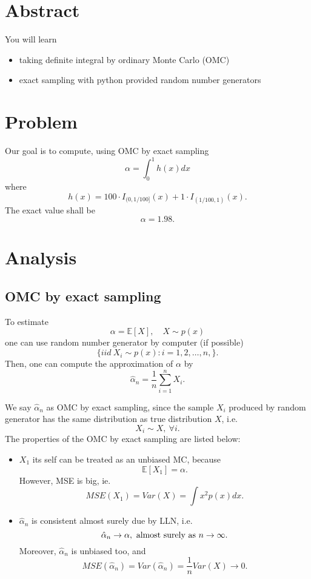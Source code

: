 \documentclass{article}
\begin{document}
\section{Abstract}
You will learn
\begin{itemize}
 \item taking definite integral by ordinary Monte Carlo (OMC)
 \item exact sampling with python provided random number generators
\end{itemize}

\section{Problem}
Our goal is to compute, using OMC by exact sampling
$$\alpha = \int_0^1 h(x) dx$$
where
$$h(x) = 100 \cdot I_{(0, 1/100]}(x) + 1\cdot I_{(1/100, 1)} (x).$$
The exact value shall be 
$$\alpha = 1.98.$$

\section{Analysis}

\subsection{OMC by exact sampling}
To estimate 
$$\alpha = \mathbb E[X], \quad X \sim p(x)$$
one can use random number generator by computer (if possible)
$$\{iid \ X_i \sim p(x): i = 1, 2, \ldots, n, \} .$$
Then, one can compute the approximation of $\alpha$ by
$$\hat \alpha_n = \frac 1 n \sum_{i=1}^n X_i.$$

We say $\hat \alpha_n$ as OMC by exact sampling, since the sample $X_i$
produced by random generator has the same distribution as true distribution $X$, 
i.e. 
$$X_i \sim X, \ \forall i.$$
The properties of the OMC by exact sampling are listed below:
\begin{itemize}
 \item $X_1$ its self can be treated as an unbiased MC, because
 $$\mathbb E [X_1] = \alpha.$$
 However, MSE is big, ie.
 $$MSE(X_1) = Var(X) = \int x^2 p(x) dx.$$
 \item $\hat \alpha_n$ is consistent almost surely due by LLN, i.e.
 $$\hat \alpha_n \to \alpha, \hbox{ almost surely as } n\to \infty.$$
 Moreover, $\hat \alpha_n$ is unbiased too, and
 $$MSE(\hat \alpha_n) = Var(\hat \alpha_n) = \frac 1 n Var(X) \to 0.$$
\end{itemize}
\end{document}
